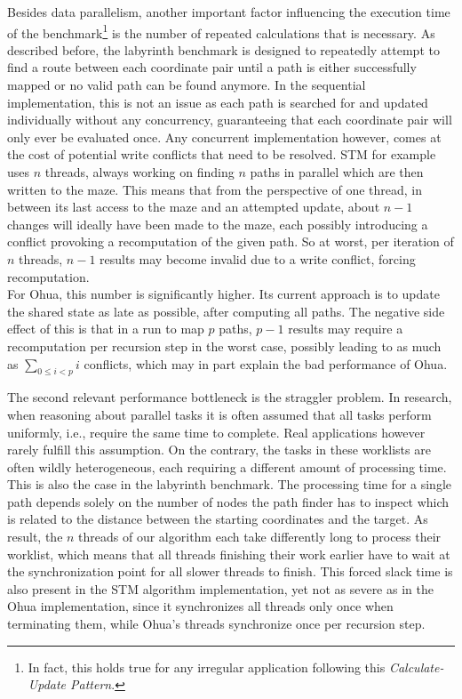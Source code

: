 Besides data parallelism, another important factor influencing the execution time of the benchmark\footnote{In fact, this holds true for any irregular application following this \emph{Calculate-Update Pattern}.} is the number of repeated calculations that is necessary.
As described before, the labyrinth benchmark is designed to repeatedly attempt to find a route between each coordinate pair until a path is either successfully mapped or no valid path can be found anymore.
In the sequential implementation, this is not an issue as each path is searched for and updated individually without any concurrency, guaranteeing that each coordinate pair will only ever be evaluated once.
Any concurrent implementation however, comes at the cost of potential write conflicts that need to be resolved.
STM for example uses $n$ threads, always working on finding $n$ paths in parallel which are then written to the maze.
This means that from the perspective of one thread, in between its last access to the maze and an attempted update, about $n - 1$ changes will ideally have been made to the maze, each possibly introducing a conflict provoking a recomputation of the given path.
So at worst, per iteration of $n$ threads, $n-1$ results may become invalid due to a write conflict, forcing recomputation.\\
For Ohua, this number is significantly higher.
Its current approach is to update the shared state as late as possible, after computing all paths.
The negative side effect of this is that in a run to map $p$ paths, $p-1$ results may require a recomputation per recursion step in the worst case, possibly leading to as much as $\sum_{0 \leq i < p} i$ conflicts, which may in part explain the bad performance of Ohua.

The second relevant performance bottleneck is the straggler problem.
In research, when reasoning about parallel tasks it is often assumed that all tasks perform uniformly, i.e., require the same time to complete.
Real applications however rarely fulfill this assumption.
On the contrary, the tasks in these worklists are often wildly heterogeneous, each requiring a different amount of processing time.
This is also the case in the labyrinth benchmark.
The processing time for a single path depends solely on the number of nodes the path finder has to inspect which is related to the distance between the starting coordinates and the target.
As result, the $n$ threads of our algorithm each take differently long to process their worklist, which means that all threads finishing their work earlier have to wait at the synchronization point for all slower threads to finish.
This forced slack time is also present in the STM algorithm implementation, yet not as severe as in the Ohua implementation, since it synchronizes all threads only once when terminating them, while Ohua's threads synchronize once per recursion step.



